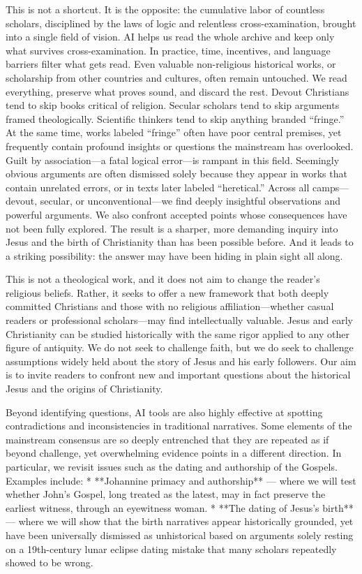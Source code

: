 This is not a shortcut.
It is the opposite: the cumulative labor of countless scholars, disciplined by the laws of logic and relentless cross-examination, brought into a single field of vision.
AI helps us read the whole archive and keep only what survives cross-examination.
In practice, time, incentives, and language barriers filter what gets read.
Even valuable non-religious historical works, or scholarship from other countries and cultures, often remain untouched.
We read everything, preserve what proves sound, and discard the rest.
Devout Christians tend to skip books critical of religion.
Secular scholars tend to skip arguments framed theologically.
Scientific thinkers tend to skip anything branded “fringe.”
At the same time, works labeled “fringe” often have poor central premises, yet frequently contain profound insights or questions the mainstream has overlooked.
Guilt by association—a fatal logical error—is rampant in this field.
Seemingly obvious arguments are often dismissed solely because they appear in works that contain unrelated errors, or in texts later labeled “heretical.”
Across all camps—devout, secular, or unconventional—we find deeply insightful observations and powerful arguments.
We also confront accepted points whose consequences have not been fully explored.
The result is a sharper, more demanding inquiry into Jesus and the birth of Christianity than has been possible before.
And it leads to a striking possibility: the answer may have been hiding in plain sight all along.

This is not a theological work, and it does not aim to change the reader’s religious beliefs.
Rather, it seeks to offer a new framework that both deeply committed Christians and those with no religious affiliation—whether casual readers or professional scholars—may find intellectually valuable.
Jesus and early Christianity can be studied historically with the same rigor applied to any other figure of antiquity.
We do not seek to challenge faith, but we do seek to challenge assumptions widely held about the story of Jesus and his early followers.
Our aim is to invite readers to confront new and important questions about the historical Jesus and the origins of Christianity.

Beyond identifying questions, AI tools are also highly effective at spotting contradictions and inconsistencies in traditional narratives.
Some elements of the mainstream consensus are so deeply entrenched that they are repeated as if beyond challenge, yet overwhelming evidence points in a different direction.
In particular, we revisit issues such as the dating and authorship of the Gospels.
Examples include:
* **Johannine primacy and authorship** — where we will test whether John’s Gospel, long treated as the latest, may in fact preserve the earliest witness, through an eyewitness woman.
* **The dating of Jesus’s birth** — where we will show that the birth narratives appear historically grounded, yet have been universally dismissed as unhistorical based on arguments solely resting on a 19th-century lunar eclipse dating mistake that many scholars repeatedly showed to be wrong.

